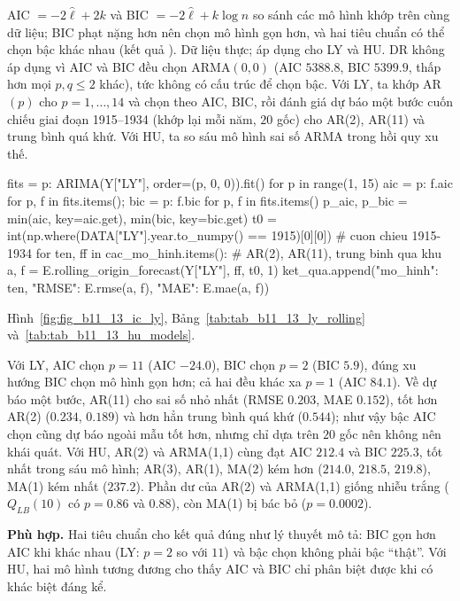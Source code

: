  AIC $=-2\hat\ell+2k$ và BIC $=-2\hat\ell+k\log n$ so sánh các mô hình khớp trên cùng dữ liệu; BIC phạt nặng hơn nên chọn mô hình gọn hơn, và hai tiêu chuẩn có thể chọn bậc khác nhau (kết quả ).
 Dữ liệu thực; áp dụng cho LY và HU. DR không áp dụng vì AIC và BIC đều chọn ARMA$(0,0)$ (AIC $5388.8$, BIC $5399.9$, thấp hơn mọi $p,q\le2$ khác), tức không có cấu trúc để chọn bậc. Với LY, ta khớp AR$(p)$ cho $p=1,\dots,14$ và chọn theo AIC, BIC, rồi đánh giá dự báo một bước cuốn chiếu giai đoạn 1915--1934 (khớp lại mỗi năm, $20$ gốc) cho AR(2), AR(11) và trung bình quá khứ. Với HU, ta so sáu mô hình sai số ARMA trong hồi quy xu thế.
\begin{codeblock}
fits = {p: ARIMA(Y["LY"], order=(p, 0, 0)).fit() for p in range(1, 15)}
aic = {p: f.aic for p, f in fits.items()}; bic = {p: f.bic for p, f in fits.items()}
p_aic, p_bic = min(aic, key=aic.get), min(bic, key=bic.get)
t0 = int(np.where(DATA["LY"].year.to_numpy() == 1915)[0][0])      # cuon chieu 1915-1934
for ten, ff in cac_mo_hinh.items():           # AR(2), AR(11), trung binh qua khu
    a, f = E.rolling_origin_forecast(Y["LY"], ff, t0, 1)
    ket_qua.append({"mo_hinh": ten, "RMSE": E.rmse(a, f), "MAE": E.mae(a, f)})
\end{codeblock}
 Hình~\ref{fig:fig_b11_13_ic_ly}, Bảng~\ref{tab:tab_b11_13_ly_rolling} và~\ref{tab:tab_b11_13_hu_models}.


 Với LY, AIC chọn $p=11$ (AIC $-24.0$), BIC chọn $p=2$ (BIC $5.9$), đúng xu hướng BIC chọn mô hình gọn hơn; cả hai đều khác xa $p=1$ (AIC $84.1$). Về dự báo một bước, AR(11) cho sai số nhỏ nhất (RMSE $0.203$, MAE $0.152$), tốt hơn AR(2) ($0.234$, $0.189$) và hơn hẳn trung bình quá khứ ($0.544$); như vậy bậc AIC chọn cũng dự báo ngoài mẫu tốt hơn, nhưng chỉ dựa trên $20$ gốc nên không nên khái quát. Với HU, AR(2) và ARMA(1,1) cùng đạt AIC $212.4$ và BIC $225.3$, tốt nhất trong sáu mô hình; AR(3), AR(1), MA(2) kém hơn ($214.0$, $218.5$, $219.8$), MA(1) kém nhất ($237.2$). Phần dư của AR(2) và ARMA(1,1) giống nhiễu trắng ($Q_{LB}(10)$ có $p=0.86$ và $0.88$), còn MA(1) bị bác bỏ ($p=0.0002$).

 \textbf{Phù hợp.} Hai tiêu chuẩn cho kết quả đúng như lý thuyết mô tả: BIC gọn hơn AIC khi khác nhau (LY: $p=2$ so với $11$) và bậc chọn không phải bậc ``thật''. Với HU, hai mô hình tương đương cho thấy AIC và BIC chỉ phân biệt được khi có khác biệt đáng kể.


